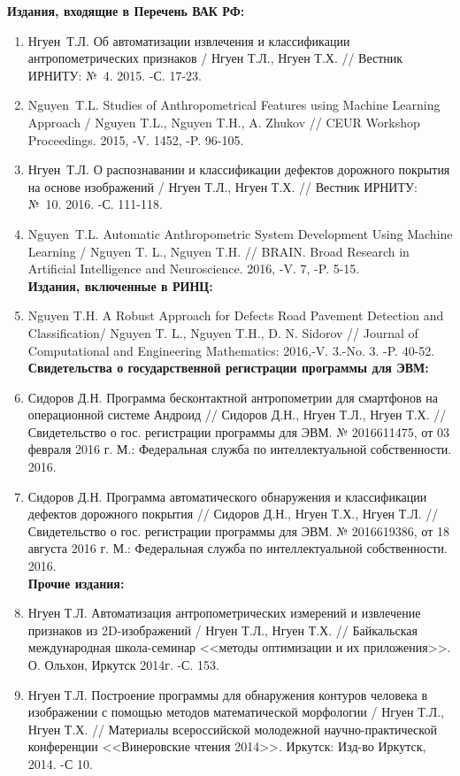 \textbf{Издания, входящие в Перечень ВАК РФ:}

\begin{enumerate}
	\item Нгуен~Т.Л. Об автоматизации извлечения и классификации антропометрических признаков / Нгуен Т.Л., Нгуен Т.Х. // Вестник ИРНИТУ: №~4. 2015. -С. 17-23.
	\item  Nguyen~T.L. Studies of Anthropometrical Features using Machine Learning Approach / Nguyen T.L., Nguyen T.H., A. Zhukov // CEUR Workshop Proceedings. 2015, -V. 1452, -P. 96-105.
	\item Нгуен~Т.Л. О распознавании и классификации дефектов дорожного покрытия на основе изображений / Нгуен Т.Л., Нгуен Т.Х. // Вестник ИРНИТУ: №~10. 2016. -С. 111-118.
	\item Nguyen~T.L. Automatic Anthropometric System Development Using Machine Learning / Nguyen T. L., Nguyen T.H. // BRAIN. Broad Research in Artificial Intelligence and Neuroscience. 2016, -V. 7, -P. 5-15.\\
	\textbf{Издания, включенные в РИНЦ:}
	\item Nguyen T.H. A Robust Approach for Defects Road Pavement Detection and Classification/ Nguyen T. L., Nguyen T.H., D. N. Sidorov // Journal of Computational and Engineering Mathematics: 2016,-V. 3.-No. 3. -P. 40-52.\\
	\textbf{Свидетельства о государственной регистрации программы для ЭВМ:}
	\item  Сидоров Д.Н. Программа бесконтактной антропометрии для смартфонов на операционной системе Андроид // Сидоров Д.Н., Нгуен Т.Л., Нгуен Т.Х. // Свидетельство о гос. регистрации программы для ЭВМ. № 2016611475, от 03 февраля 2016 г. М.: Федеральная служба по интеллектуальной собственности. 2016.
	\item  Сидоров Д.Н. Программа автоматического обнаружения и классификации дефектов дорожного покрытия // Сидоров Д.Н.,  Нгуен Т.Х., Нгуен Т.Л. // Свидетельство о гос. регистрации программы для ЭВМ. № 2016619386, от 18 августа  2016 г. М.: Федеральная служба по интеллектуальной собственности. 2016.\\
\textbf{Прочие издания:}
\item  Нгуен Т.Л. Автоматизация антропометрических измерений и извлечение признаков из 2D-изображений / Нгуен Т.Л., Нгуен Т.Х. // Байкальская международная школа-семинар <<методы оптимизации и их приложения>>. О. Ольхон, Иркутск 2014г. -С. 153.
\item Нгуен Т.Л. Построение программы для обнаружения контуров человека в изображении с помощью методов математической морфологии / Нгуен Т.Л., Нгуен Т.Х. // Материалы всероссийской молодежной научно-практической конференции <<Винеровские чтения 2014>>. Иркутск: Изд-во Иркутск, 2014. -С 10.

\end{enumerate}
